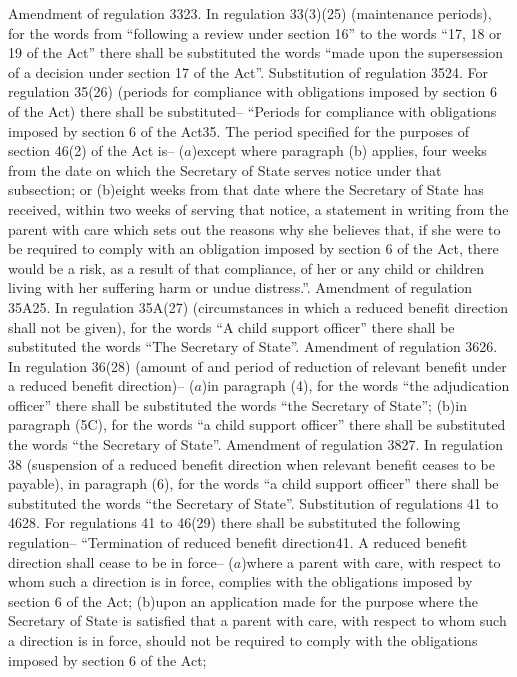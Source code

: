 \documentclass[12pt,a4paper]{article}
\begin{document}
Amendment of regulation 3323.  In regulation 33(3)(25) (maintenance periods), for the words from “following a review under section 16” to the words “17, 18 or 19 of the Act” there shall be substituted the words “made upon the supersession of a decision under section 17 of the Act”.
Substitution of regulation 3524.  For regulation 35(26) (periods for compliance with obligations imposed by section 6 of the Act) there shall be substituted–
“Periods for compliance with obligations imposed by section 6 of the Act35.  The period specified for the purposes of section 46(2) of the Act is–
($a$)except where paragraph (b) applies, four weeks from the date on which the Secretary of State serves notice under that subsection; or
(b)eight weeks from that date where the Secretary of State has received, within two weeks of serving that notice, a statement in writing from the parent with care which sets out the reasons why she believes that, if she were to be required to comply with an obligation imposed by section 6 of the Act, there would be a risk, as a result of that compliance, of her or any child or children living with her suffering harm or undue distress.”.
Amendment of regulation 35A25.  In regulation 35A(27) (circumstances in which a reduced benefit direction shall not be given), for the words “A child support officer” there shall be substituted the words “The Secretary of State”.
Amendment of regulation 3626.  In regulation 36(28) (amount of and period of reduction of relevant benefit under a reduced benefit direction)–
($a$)in paragraph (4), for the words “the adjudication officer” there shall be substituted the words “the Secretary of State”;
(b)in paragraph (5C), for the words “a child support officer” there shall be substituted the words “the Secretary of State”.
Amendment of regulation 3827.  In regulation 38 (suspension of a reduced benefit direction when relevant benefit ceases to be payable), in paragraph (6), for the words “a child support officer” there shall be substituted the words “the Secretary of State”.
Substitution of regulations 41 to 4628.  For regulations 41 to 46(29) there shall be substituted the following regulation–
“Termination of reduced benefit direction41.  A reduced benefit direction shall cease to be in force–
($a$)where a parent with care, with respect to whom such a direction is in force, complies with the obligations imposed by section 6 of the Act;
(b)upon an application made for the purpose where the Secretary of State is satisfied that a parent with care, with respect to whom such a direction is in force, should not be required to comply with the obligations imposed by section 6 of the Act;
\end{document}
